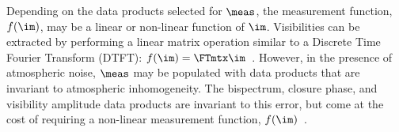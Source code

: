 Depending on the data products selected for $\meas$, the measurement function, $f(\im)$, may be a linear or non-linear function of $\im$. %
Visibilities can be extracted by performing a linear matrix operation similar to a Discrete Time Fourier Transform (DTFT): $f(\im) = \FTmtx \im$~\cite{bouman2016computational}. However, in the presence of atmospheric noise, 
$\meas$ may be populated with data products that are invariant to atmospheric inhomogeneity.
The bispectrum, closure phase, and visibility amplitude data products are invariant to this error, but come at the cost of requiring a non-linear measurement function, $f(\im)$~\cite{bouman2016computational, andrew, buscher1994direct}. 







